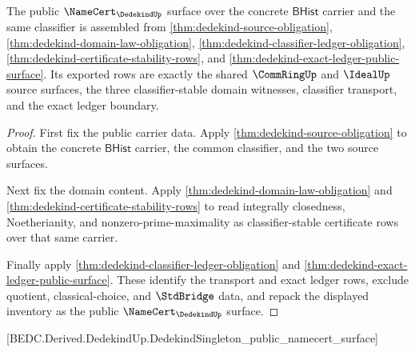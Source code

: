 \begin{theorem}\label{thm:dedekind-public-namecert-surface}
The public $\NameCert_{\DedekindUp}$ surface over the concrete $\mathsf{BHist}$ carrier and the same classifier is assembled from \autoref{thm:dedekind-source-obligation}, \autoref{thm:dedekind-domain-law-obligation}, \autoref{thm:dedekind-classifier-ledger-obligation}, \autoref{thm:dedekind-certificate-stability-rows}, and \autoref{thm:dedekind-exact-ledger-public-surface}. Its exported rows are exactly the shared $\CommRingUp$ and $\IdealUp$ source surfaces, the three classifier-stable domain witnesses, classifier transport, and the exact ledger boundary.
\end{theorem}
\begin{proof}
First fix the public carrier data. Apply \autoref{thm:dedekind-source-obligation} to obtain the concrete $\mathsf{BHist}$ carrier, the common classifier, and the two source surfaces.

Next fix the domain content. Apply \autoref{thm:dedekind-domain-law-obligation} and \autoref{thm:dedekind-certificate-stability-rows} to read integrally closedness, Noetherianity, and nonzero-prime-maximality as classifier-stable certificate rows over that same carrier.

Finally apply \autoref{thm:dedekind-classifier-ledger-obligation} and \autoref{thm:dedekind-exact-ledger-public-surface}. These identify the transport and exact ledger rows, exclude quotient, classical-choice, and $\StdBridge$ data, and repack the displayed inventory as the public $\NameCert_{\DedekindUp}$ surface.
\end{proof}

[BEDC.Derived.DedekindUp.DedekindSingleton\_public\_namecert\_surface]

